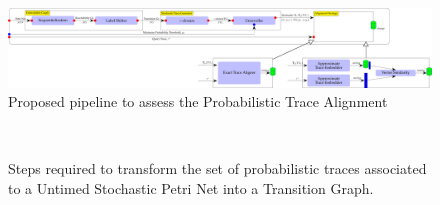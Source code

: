 \begin{figure}[!t]
	\hspace*{-4cm}\includegraphics[width=1.7\textwidth]{images/pipeline}
	\caption{Proposed pipeline to assess the Probabilistic Trace Alignment}\label{fig:pipe}
\end{figure}

\begin{figure}[!ph]
	\centering
	\qquad
	\\
	\caption{Steps required to transform the set of probabilistic traces associated to a Untimed Stochastic Petri Net into a Transition Graph.}
	\label{transformspn}
\end{figure}
